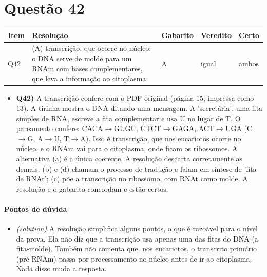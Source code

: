 \documentclass{article}%
\begin{document}
\section*{Questão 42}%
\begin{longtable}{@{}p{} p{} p{} p{} p{}@{}}\toprule Item & Resolução & Gabarito & Veredito & Certo \\ \midrule
Q42 & (A) transcrição, que ocorre no núcleo; o DNA serve de molde para um RNAm com bases complementares, que leva a informação ao citoplasma & A & igual & ambos \\
\bottomrule\end{longtable}%
\begin{itemize}%
\item%
\textbf{Q42)} A transcrição confere com o PDF original (página 15, impressa como 13). A tirinha mostra o DNA ditando uma mensagem. A 'secretária', uma fita simples de RNA, escreve a fita complementar e usa U no lugar de T. O pareamento confere: CACA$\to$GUGU, CTCT$\to$GAGA, ACT$\to$UGA (C$\to$G, A$\to$U, T$\to$A). Isso é transcrição, que nos eucariotos ocorre no núcleo, e o RNAm vai para o citoplasma, onde ficam os ribossomos. A alternativa (a) é a única coerente. A resolução descarta corretamente as demais: (b) e (d) chamam o processo de tradução e falam em síntese de 'fita de RNAt'; (c) põe a transcrição no ribossomo, com RNAt como molde. A resolução e o gabarito concordam e estão certos.%
\end{itemize}%
\paragraph{Pontos de dúvida}%
\begin{itemize}%
\item%
\textit{(solution)} A resolução simplifica alguns pontos, o que é razoável para o nível da prova. Ela não diz que a transcrição usa apenas uma das fitas do DNA (a fita{-}molde). Também não comenta que, nos eucariotos, o transcrito primário (pré{-}RNAm) passa por processamento no núcleo antes de ir ao citoplasma. Nada disso muda a resposta.%
\end{itemize}%
\end{document}
